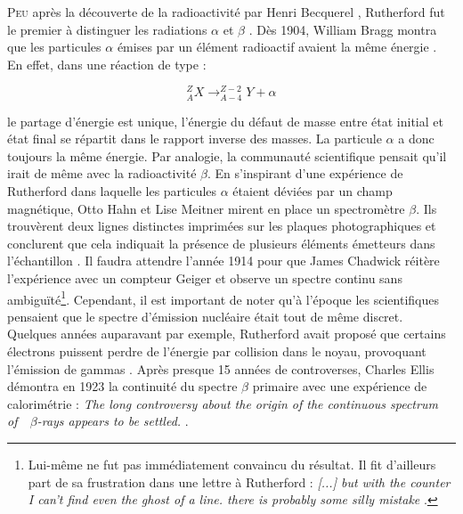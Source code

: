 \bigbreak

\lettrine{P}{eu} après la découverte de la radioactivité par Henri Becquerel \cite{Becquerel:475481}, Rutherford fut le premier à distinguer les radiations $\alpha$ et $\beta$ \cite{Rutherford:261896}. Dès 1904, William Bragg montra que les particules $\alpha$ émises par un élément radioactif avaient la même énergie \cite{doi:10.1080/14786440409463245}. En effet, dans une réaction de type :

\begin{equation}
    ^{Z}_{A}X \rightarrow ^{Z-2}_{A-4}Y + \alpha
\end{equation}

\bigbreak

\noindent
le partage d'énergie est unique, l'énergie du défaut de masse entre état initial et état final se répartit dans le rapport inverse des masses. La particule $\alpha$ a donc toujours la même énergie. Par analogie, la communauté scientifique pensait qu'il irait de même avec la radioactivité $\beta$. En s'inspirant d'une expérience de Rutherford dans laquelle les particules $\alpha$ étaient déviées par un champ magnétique, Otto Hahn et Lise Meitner mirent en place un spectromètre $\beta$. Ils trouvèrent deux lignes distinctes imprimées sur les plaques photographiques et conclurent que cela indiquait la présence de plusieurs éléments émetteurs dans l'échantillon \cite{Baeyer:1911:SAN}. Il faudra attendre l'année 1914 pour que James Chadwick réitère l'expérience avec un compteur Geiger \cite{Chadwick:262756} et observe un spectre continu sans ambiguïté\footnote{Lui-même ne fut pas immédiatement convaincu du résultat. Il fit d'ailleurs part de sa frustration dans une lettre à Rutherford : \og \textit{[...] but with the counter I can’t find even the ghost of a line. there is probably some silly mistake} \fg{} \cite{brown1997neutron}.}. Cependant, il est important de noter qu'à l'époque les scientifiques pensaient que le spectre d'émission nucléaire était tout de même discret. Quelques années auparavant par exemple, Rutherford avait proposé que certains électrons puissent perdre de l'énergie par collision dans le noyau, provoquant l'émission de gammas \cite{doi:10.1080/14786441008637351}. Après presque 15 années de controverses, Charles Ellis démontra en 1923 la continuité du spectre $\beta$ primaire avec une expérience de calorimétrie : \og \textit{The long controversy about the origin of the continuous spectrum of\ \ $\beta$-rays appears to be settled.}\fg{} \cite{1927RSPSA.117..109E}.\\

